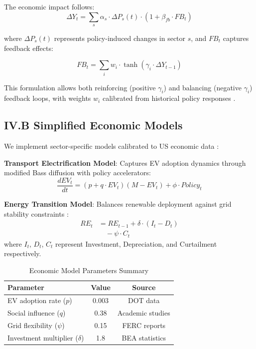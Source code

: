 \documentclass[10pt,twocolumn]{article}
\begin{document}
The economic impact follows:
\begin{equation}
\Delta Y_t = \sum_s \alpha_s \cdot \Delta P_s(t) \cdot (1 + \beta_{fb} \cdot FB_t)
\end{equation}

where $\Delta P_s(t)$ represents policy-induced changes in sector $s$, and $FB_t$ captures feedback effects:

\begin{equation}
FB_t = \sum_i w_i \cdot \tanh(\gamma_i \cdot \Delta Y_{t-1})
\end{equation}

This formulation allows both reinforcing (positive $\gamma_i$) and balancing (negative $\gamma_i$) feedback loops, with weights $w_i$ calibrated from historical policy responses \citep{agarwala2021climate}.

\subsection{IV.B Simplified Economic Models}

We implement sector-specific models calibrated to US economic data \citep{feyen2020macro, fabisik2021firms}:

\textbf{Transport Electrification Model}: Captures EV adoption dynamics through modified Bass diffusion with policy accelerators:
\begin{equation}
\frac{dEV_t}{dt} = (p + q \cdot EV_t)(M - EV_t) + \phi \cdot Policy_t
\end{equation}

\textbf{Energy Transition Model}: Balances renewable deployment against grid stability constraints \citep{pizzutilo2020dealing, roncalli2021market}:
\begin{equation}
\begin{split}
RE_t &= RE_{t-1} + \delta \cdot (I_t - D_t) \\
&\quad - \psi \cdot C_t
\end{split}
\end{equation}
where $I_t$, $D_t$, $C_t$ represent Investment, Depreciation, and Curtailment respectively.

\begin{table}[!h]
\centering
\caption{Economic Model Parameters Summary}
\label{tab:model_params}
\small
\begin{tabular}{lcc}
\toprule
Parameter & Value & Source \\
\midrule
EV adoption rate ($p$) & 0.003 & DOT data \\
Social influence ($q$) & 0.38 & Academic studies \\
Grid flexibility ($\psi$) & 0.15 & FERC reports \\
Investment multiplier ($\delta$) & 1.8 & BEA statistics \\
\bottomrule
\end{tabular}
\end{table}
\end{document}
